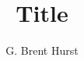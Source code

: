 \documentclass[12pt]{article}
\begin{document}
\title{Title}
\author{G. Brent Hurst}
\maketitle
\end{document}
